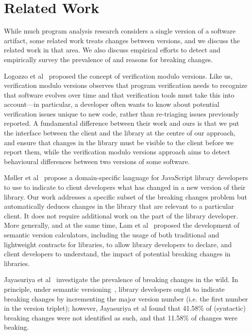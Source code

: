 \chapter{Related Work}\label{related}
While much program analysis research considers a single version of a software artifact, some related work treats changes between versions, and we discuss the related work in that area. We also discuss empirical efforts to detect and empirically survey the prevalence of and reasons for breaking changes.

Logozzo et al~\cite{logozzo14:_verif_modul_version} proposed the concept of verification modulo versions. Like us, verification modulo versions observes that program verification needs to recognize that software evolves over time and that verification tools must take this into account---in particular, a developer often wants to know about potential verification issues unique to new code, rather than re-triaging issues previously reported. A fundamental difference between their work and ours is that we put the interface between the client and the library at the centre of our approach, and ensure that changes in the library must be visible to the client before we report them, while the verification modulo versions approach aims to detect behavioural differences between two versions of some software.

Møller et al~\cite{møller20:_detec_locat_javas_progr_affec} propose a domain-specific language for JavaScript library developers to use to indicate to client developers what has changed in a new version of their library. Our work addresses a specific subset of the breaking changes problem but automatically deduces changes in the library that are relevant to a particular client. It does not require additional work on the part of the library developer. More generally, and at the same time, Lam et al~\cite{lam20:_puttin_seman_seman_version} proposed the development of semantic version calculators, including the usage of both traditional and lightweight contracts for libraries, to allow library developers to declare, and client developers to understand, the impact of potential breaking changes in libraries.

Jayasuriya et al~\cite{jayasuriya23:_under_break_chang_wild,jayasuriya24} investigate the prevalence of breaking changes in the wild. In principle, under semantic versioning~\cite{preston-werner23:_seman_version}, library developers ought to indicate breaking changes by incrementing the major version number (i.e. the first number in the version triplet); however, Jayasuriya et al found that 41.58\% of (syntactic) breaking changes were not identified as such, and that 11.58\% of changes were beaking.

